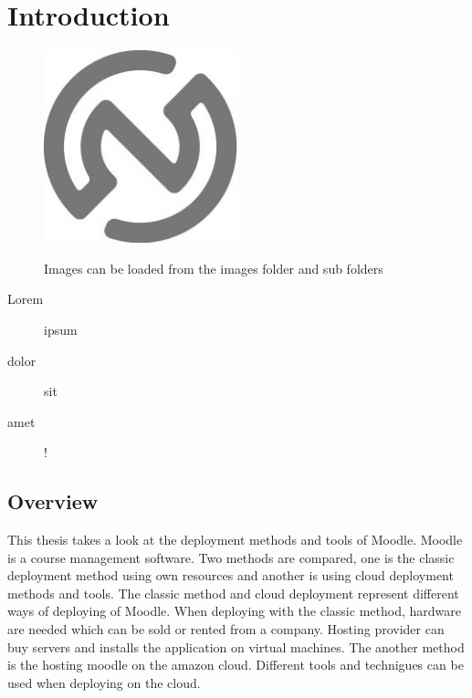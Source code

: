 \chapter{Introduction}
\label{cha:introduction}




\begin{figure}[!ht]
	\centering
	\includegraphics[width=0.5\textwidth]{images/snet_logo_gray.png}\\
	\caption{Images can be loaded from the images folder and sub folders}
	\label{fig:introduction__loremipsum}
\end{figure}



\begin{description}
	\item[Lorem] ipsum
	\item[dolor] sit
	\item[amet] !
\end{description}



\section{Overview}
This thesis takes a look at the deployment methods and tools of Moodle. Moodle is a course management software. Two methods are compared, one is the classic deployment method using own resources and another is using cloud deployment methods and tools. The classic method and cloud deployment represent different ways of deploying of Moodle. When deploying with the classic method, hardware are needed which can be sold or rented from a company. Hosting provider can buy servers and installs the application on virtual machines. The another method is the hosting moodle on the amazon cloud. Different tools and technigues can be used when deploying on the cloud. 
